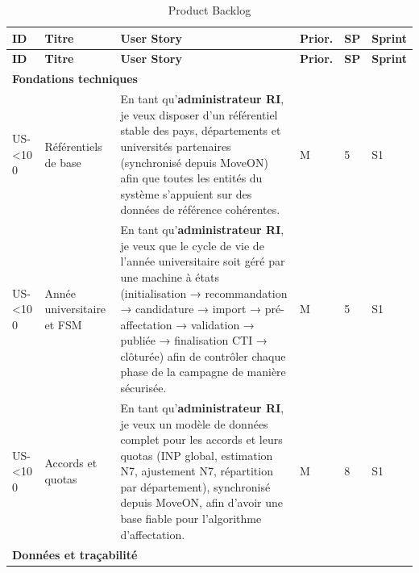 \setcounter{usnum}{1}
\newcommand{\nextus}{%
  US-\ifnum\value{usnum}<10 0\fi\arabic{usnum}%
  \stepcounter{usnum}%
}

\begingroup
\footnotesize
\setlength{\tabcolsep}{4pt}
\renewcommand{\arraystretch}{1.4}

\begin{longtable}{|p{1cm}|p{3cm}|p{7.5cm}|p{1.2cm}|p{0.9cm}|p{1cm}|}
\caption{Product Backlog}\\
\hline
\rowcolor{gray!20}
\textbf{ID} & \textbf{Titre} & \textbf{User Story} & \textbf{Prior.} & \textbf{SP} & \textbf{Sprint} \\
\hline
\endfirsthead
\hline
\rowcolor{gray!20}
\textbf{ID} & \textbf{Titre} & \textbf{User Story} & \textbf{Prior.} & \textbf{SP} & \textbf{Sprint} \\
\hline
\endhead

\multicolumn{6}{|l|}{\cellcolor{green!10}\textbf{Fondations techniques}} \\
\hline

\nextus & Référentiels de base &
En tant qu’\textbf{administrateur RI}, je veux disposer d’un référentiel
stable des pays, départements et universités partenaires (synchronisé
depuis MoveON) afin que toutes les entités du système s’appuient sur
des données de référence cohérentes. &
M & 5 & S1 \\
\hline

\nextus & Année universitaire et FSM &
En tant qu’\textbf{administrateur RI}, je veux que le cycle de vie de l’année
universitaire soit géré par une machine à états (initialisation → recommandation
→ candidature → import → pré-affectation → validation → publiée → finalisation
CTI → clôturée) afin de contrôler chaque phase de la campagne de manière
sécurisée. &
M & 5 & S1 \\
\hline

\nextus & Accords et quotas &
En tant qu’\textbf{administrateur RI}, je veux un modèle de données complet
pour les accords et leurs quotas (INP global, estimation N7, ajustement N7,
répartition par département), synchronisé depuis MoveON, afin d’avoir une
base fiable pour l’algorithme d’affectation. &
M & 8 & S1 \\
\hline

\multicolumn{6}{|l|}{\cellcolor{blue!10}\textbf{Données et traçabilité}} \\
\hline


\end{longtable}
